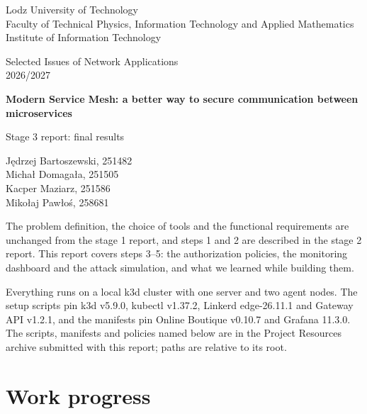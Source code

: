 \documentclass[12pt,a4paper]{article}
\begin{document}
\begin{titlepage}
  \centering
  {\large Lodz University of Technology\\
  Faculty of Technical Physics, Information Technology and Applied Mathematics\\
  Institute of Information Technology\par}
  \vspace{1.5cm}
  {\large Selected Issues of Network Applications\\2026/2027\par}
  \vspace{3cm}
  {\LARGE\bfseries Modern Service Mesh: a better way to secure communication
  between microservices\par}
  \vspace{1cm}
  {\Large Stage 3 report: final results\par}
  \vspace{3cm}
  {\large
  Jędrzej Bartoszewski, 251482\\
  Michał Domagała, 251505\\
  Kacper Maziarz, 251586\\
  Mikołaj Pawłoś, 258681\par}
  \vfill
\end{titlepage}

The problem definition, the choice of tools and the functional requirements
are unchanged from the stage 1 report, and steps 1 and 2 are described in the
stage 2 report. This report covers steps 3--5: the authorization policies, the
monitoring dashboard and the attack simulation, and what we learned while
building them.

Everything runs on a local k3d cluster with one server and two agent nodes.
The setup scripts pin k3d v5.9.0, kubectl v1.37.2, Linkerd edge-26.11.1 and
Gateway API v1.2.1, and the manifests pin Online Boutique v0.10.7 and Grafana
11.3.0. The scripts, manifests and policies named below are in the Project
Resources archive submitted with this report; paths are relative to its
root.

\section{Work progress}
\end{document}
